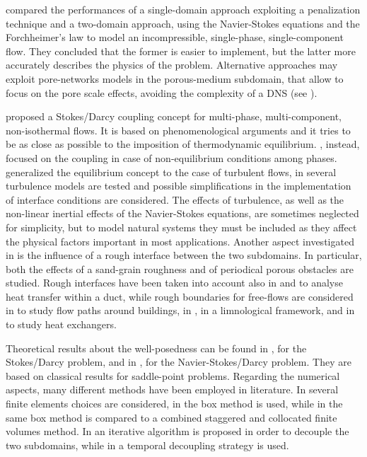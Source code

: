 \textcite{intro:discacim} compared the performances of a single-domain approach exploiting a penalization technique and a 
two-domain approach, using the Navier-Stokes equations and the Forchheimer's 
law to model an incompressible, single-phase, single-component flow. They 
concluded that the former is easier to implement, but the latter more accurately describes the physics of the problem. Alternative approaches may exploit 
pore-networks models in the porous-medium subdomain, that allow to focus on the 
pore scale effects, avoiding the complexity of a DNS (see \cite{paper:kilian}).

\textcite{paper:mosthaf} proposed a Stokes/Darcy coupling concept for multi-phase, 
multi-component, non-isothermal flows. It is based on phenomenological arguments and it tries to be as close as possible to the 
imposition of thermodynamic equilibrium. \textcite{intro:davarzani}, instead, focused on the coupling in case of non-equilibrium conditions among phases.
\textcite{paper:fetzer} generalized the equilibrium concept to the case of 
turbulent flows, in \cite{tesi:fetzer} several turbulence models are tested and 
possible simplifications in the implementation of interface conditions are 
considered. The effects of turbulence, as well as the non-linear inertial 
effects of the Navier-Stokes equations, are sometimes neglected for 
simplicity, 
but to model natural systems they must be included as they
affect the physical factors important in most applications.
Another aspect investigated in 
\cite{tesi:fetzer} is the influence of a rough interface between the two 
subdomains. In particular, both the effects of a sand-grain roughness and of 
periodical porous obstacles are studied.
Rough interfaces have been taken into account also in \cite{intro:kuzbek} and \cite{intro:kuz} to analyse heat transfer within a duct, while rough boundaries for free-flows are considered in \cite{lien:obstacles} to study flow paths around buildings, in \cite{intro:limnology}, in a limnological framework, and in \cite{intro:targui} to study heat exchangers.

Theoretical results about the well-posedness can be found in \cite{intro:disca}, for the Stokes/Darcy problem, and in \cite{intro:disca2009}, for the Navier-Stokes/Darcy problem. They are based on classical results for saddle-point problems. Regarding the numerical aspects, many different methods have been employed in literature. In \cite{intro:disca2009} several finite elements choices are considered, in \cite{tesi:mosthaf} the box method is used, while in \cite{tesi:fetzer} the same box method is compared to a combined staggered and collocated finite volumes method. In \cite{intro:disca} an iterative algorithm is proposed in order to decouple the two subdomains, while in \cite{intro:rybak} a temporal decoupling strategy is used.

